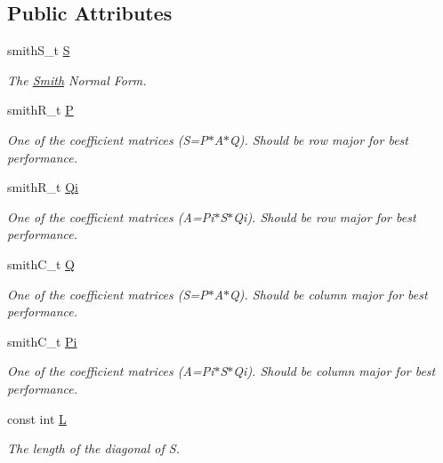 \subsection*{Public Attributes}
\begin{DoxyCompactItemize}
\item 
smith\+S\+\_\+t \hyperlink{classMackey_1_1Smith_a676606c4002b08a37f0ea11dc3686dbe}{S}
\begin{DoxyCompactList}\small\item\em The \hyperlink{classMackey_1_1Smith}{Smith} Normal Form. \end{DoxyCompactList}\item 
smith\+R\+\_\+t \hyperlink{classMackey_1_1Smith_a5a831316edd85dedc7394b39fda103a2}{P}
\begin{DoxyCompactList}\small\item\em One of the coefficient matrices (S=P$\ast$\+A$\ast$Q). Should be row major for best performance. \end{DoxyCompactList}\item 
smith\+R\+\_\+t \hyperlink{classMackey_1_1Smith_ade9f9fbe25629c7e20bc9cfe69ee91ad}{Qi}
\begin{DoxyCompactList}\small\item\em One of the coefficient matrices (A=Pi$\ast$\+S$\ast$\+Qi). Should be row major for best performance. \end{DoxyCompactList}\item 
smith\+C\+\_\+t \hyperlink{classMackey_1_1Smith_af93f16dfd0ce77406d9696a026092306}{Q}
\begin{DoxyCompactList}\small\item\em One of the coefficient matrices (S=P$\ast$\+A$\ast$Q). Should be column major for best performance. \end{DoxyCompactList}\item 
smith\+C\+\_\+t \hyperlink{classMackey_1_1Smith_a97f16eca1aa9f4f6c36c2680fdcf277e}{Pi}
\begin{DoxyCompactList}\small\item\em One of the coefficient matrices (A=Pi$\ast$\+S$\ast$\+Qi). Should be column major for best performance. \end{DoxyCompactList}\item 
const int \hyperlink{classMackey_1_1Smith_a02ea735836a4a70f504e360495b0e1e1}{L}
\begin{DoxyCompactList}\small\item\em The length of the diagonal of S. \end{DoxyCompactList}\end{DoxyCompactItemize}


